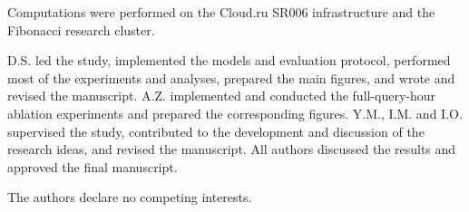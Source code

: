 \documentclass[referee,lineno,pdflatex,sn-nature]{sn-jnl}
\begin{document}



Computations were performed on the Cloud.ru SR006 infrastructure and the
Fibonacci research cluster.



D.S. led the study, implemented the models and evaluation protocol,
performed most of the experiments and analyses, prepared the main figures,
and wrote and revised the manuscript. A.Z. implemented and conducted the
full-query-hour ablation experiments and prepared the corresponding figures.
Y.M., I.M. and I.O. supervised the study, contributed to the development and
discussion of the research ideas, and revised the manuscript. All authors
discussed the results and approved the final manuscript.


The authors declare no competing interests.


\end{document}
